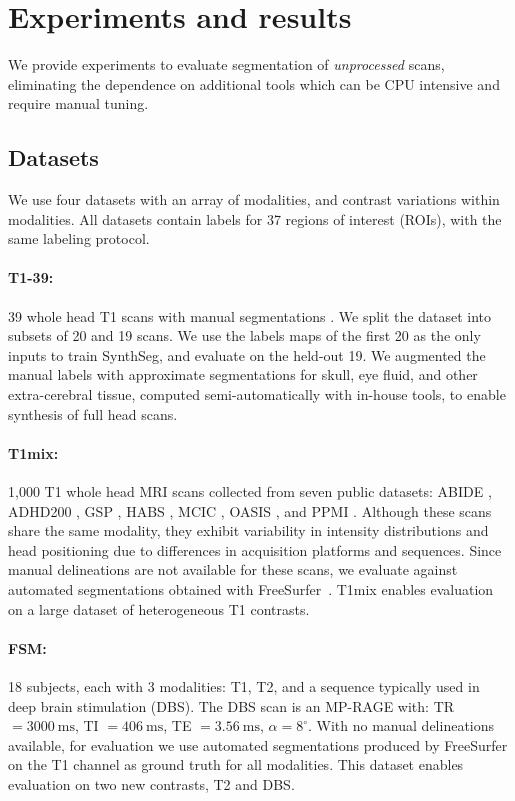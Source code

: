 \documentclass{midl}
\newcommand{\netname}{SynthSeg}
\begin{document}
\section{Experiments and results}

We provide experiments to evaluate segmentation of \textit{unprocessed} scans, eliminating the dependence on additional tools which can be CPU intensive and require manual tuning. 


\subsection{Datasets}

We use four datasets with an array of modalities, and contrast variations within modalities. All datasets contain labels for 37 regions of interest (ROIs), with the same labeling protocol.

\paragraph{T1-39:} 39 whole head T1 scans with manual segmentations \cite{fischl_freesurfer_2012}. We split the dataset into subsets of 20 and 19 scans. We use the labels maps of the first 20 as the only inputs to train \netname{}, and evaluate on the held-out 19. We augmented the manual labels with approximate segmentations for skull, eye fluid, and other extra-cerebral tissue, computed semi-automatically with in-house tools, to enable synthesis of full head scans.

\paragraph{T1mix:}  1,000 T1 whole head MRI scans collected from seven public datasets: ABIDE \cite{di_martino_autism_2014}, ADHD200 \cite{the_adhd-200_consortium_adhd-200_2012}, GSP \cite{holmes_brain_2015}, HABS \cite{dagley_harvard_2017}, MCIC \cite{gollub_mcic_2013}, OASIS \cite{marcus_open_2007}, and PPMI \cite{marek_parkinson_2011}. Although these scans share the same modality, they exhibit variability in intensity distributions and head positioning due to differences in acquisition platforms and sequences. Since manual delineations are not available for these scans, we evaluate against automated segmentations obtained with FreeSurfer~\cite{fischl_freesurfer_2012,dalca_anatomical_2018}. T1mix enables evaluation on a large dataset of heterogeneous T1 contrasts.

\paragraph{FSM:} 18 subjects, each with 3 modalities: T1, T2, and a sequence typically used in deep brain stimulation (DBS). The DBS scan is an MP-RAGE with: TR $= \SI{3000}{\milli\second}$, TI $= \SI{406}{\milli\second}$, TE $=\SI{3.56}{\milli\second}$, $\alpha = 8^\circ$. With no manual delineations available, for evaluation we use automated segmentations produced by FreeSurfer on the T1 channel as ground truth for all modalities. This dataset enables evaluation on two new contrasts, T2 and DBS.
\end{document}
